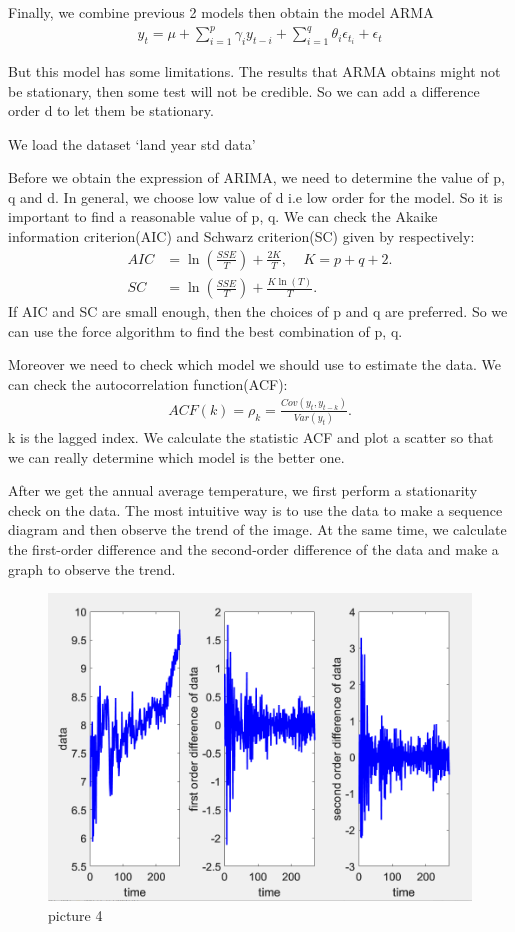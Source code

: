 \documentclass{apmcmthesis}
\begin{document}
Finally, we combine previous 2 models then obtain the model ARMA
\begin{align*}
  y_t = \mu + \sum^p_{i=1} \gamma_i y_{t-i}  + \sum^q_{i=1} \theta_i \epsilon_{t_i} + \epsilon_t
\end{align*}

But this model has some limitations.
The results that ARMA obtains might not be stationary, then some test will not be credible. 
So we can add a difference order d to let them be stationary. 

We load the dataset `land year std data'

Before we obtain the expression of ARIMA, we need to determine the value of p, q and d.
In general, we choose low value of d i.e low order for the model. 
So it is important to find a reasonable value of p, q.
We can check the Akaike information criterion(AIC) and Schwarz criterion(SC) 
given by respectively:
\begin{align*}
  AIC&=\ln(\frac{SSE}{T})+\frac{2K}{T},\;\;\;\;K=p+q+2.\\
  SC&=\ln(\frac{SSE}{T})+\frac{K\ln(T)}{T}.
\end{align*}
If AIC and SC are small enough, then the choices of p and q are preferred.
So we can use the force algorithm to find the best combination of p, q.

Moreover we need to check which model we should use to estimate the data.
We can check the autocorrelation function(ACF):
\begin{align*}
  ACF(k)=\rho_k = \frac{Cov(y_t,y_{t-k})}{Var(y_t)}.
\end{align*}
k is the lagged index.
We calculate the statistic ACF and plot a scatter so that we can really determine which model is the better one.

After we get the annual average temperature, we first perform a stationarity check on the data. The most intuitive way is to use the data to make a sequence diagram and then observe the trend of the image. At the same time, we calculate the first-order difference and the second-order difference of the data and make a graph to observe the trend.

\begin{figure}[htbp]
  \centering
  \includegraphics[scale=0.35]{Smoothness Analysis.png}
  \caption*{picture 4}\label{fig5}
\end{figure}
\end{document}
